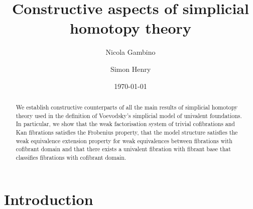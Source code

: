 \documentclass[reqno,10pt,a4paper,oneside,draft]{amsart}
\title[]{Constructive aspects of simplicial homotopy theory}
\begin{document}
\begin{abstract}
We establish constructive counterparts of all the main results of simplicial homotopy theory
used in the definition of Voevodsky's simplicial model of univalent foundations. In particular, we
show that the weak factorisation system of trivial cofibrations and Kan fibrations satisfies the 
Frobenius property, that the model structure satisfies the weak equivalence extension property
for weak equivalences between fibrations with cofibrant domain and that there exists a univalent 
 fibration with fibrant base that classifies fibrations with cofibrant domain.
\end{abstract}

\author{Nicola Gambino}
\address{School of Mathematics, University of Leeds, Leeds LS2 9JT, United Kingdom}


\author{Simon Henry}
\address{Department of Mathematics and Statistics, Masaryk University, Brno, Czeck Republic}


 \date{\today}
 
 

\maketitle

\tableofcontents

\newpage

\section*{Introduction} 
\end{document}
